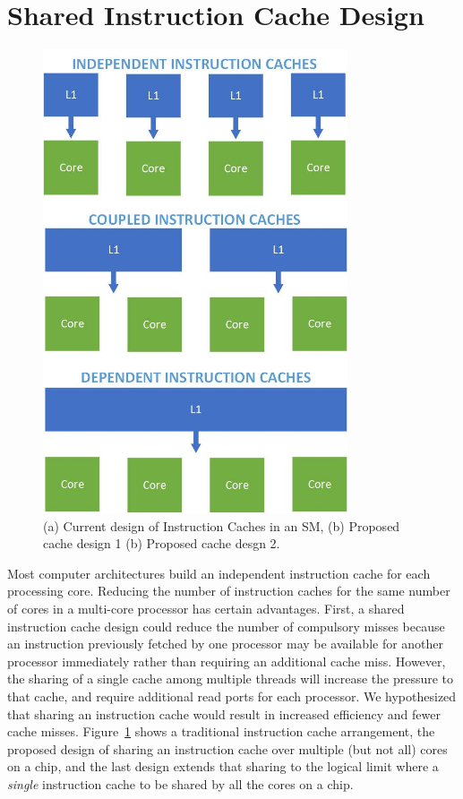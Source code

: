\section{Shared Instruction Cache Design}

\begin{figure}[ht!]
\centering
\includegraphics[width=90mm]{InstructionCacheDesignSketches.jpg}
\caption{(a) Current design of Instruction Caches in an SM, (b) Proposed cache design 1 (b) Proposed cache desgn 2.}
\label{propDesign}
\end{figure}

Most computer architectures build an independent instruction cache for
each processing core.
Reducing the number of instruction caches for the same number of cores
in a multi-core processor has certain advantages. 
First, a shared instruction cache design could reduce the number of
compulsory misses because an instruction previously fetched
by one processor may be available for another processor immediately
rather than requiring an additional cache miss. 
However, the sharing of a single cache among multiple threads will
increase the pressure to that cache, and require additional read ports
for each processor.
We hypothesized that sharing an instruction cache would result in
increased efficiency and fewer cache misses. 
Figure~\ref{propDesign} shows a traditional instruction cache
arrangement, the proposed design of sharing an instruction cache over
multiple (but not all) cores on a chip, and the last design extends
that sharing to the logical limit where a \emph{single} instruction
cache to be shared by all the cores on a chip.
 




